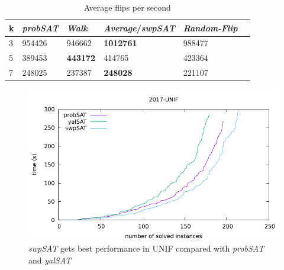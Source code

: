 \documentclass[12pt,a4paper,twoside]{scrartcl}
\numberwithin{equation}{section}
\begin{document}
   \begin{table}[H]
   \label{tab:flips}
\begin{center}
    \begin{tabular}{|l|l|l|l|l|p{3cm}|}
\hline 

    k &\emph{probSAT}&\emph{Walk}&\emph{Average}/\emph{swpSAT}&\emph{Random-Flip} \\ \hline      
    3& 954426 &946662 &\textbf{1012761}&988477 \\ \hline
    5& 389453&\textbf{443172}&414765&423364\\ \hline
    7& 248025 &237387 &\textbf{248028}&221107 \\ \hline
	
\end{tabular}
\end{center}
\caption{Average flips per second}
\end{table}
  \begin{figure}[H]
\begin{center}
  \includegraphics[scale = 1]{DATA/UNIF/e5.pdf}
  \end{center}
  \caption{\emph{swpSAT} gets best performance in UNIF compared with \emph{probSAT} and \emph{yalSAT} }
  \label{Experiment 9 all cactus plot}
  \end{figure} 
\clearpage
\clearpage
\end{document}
